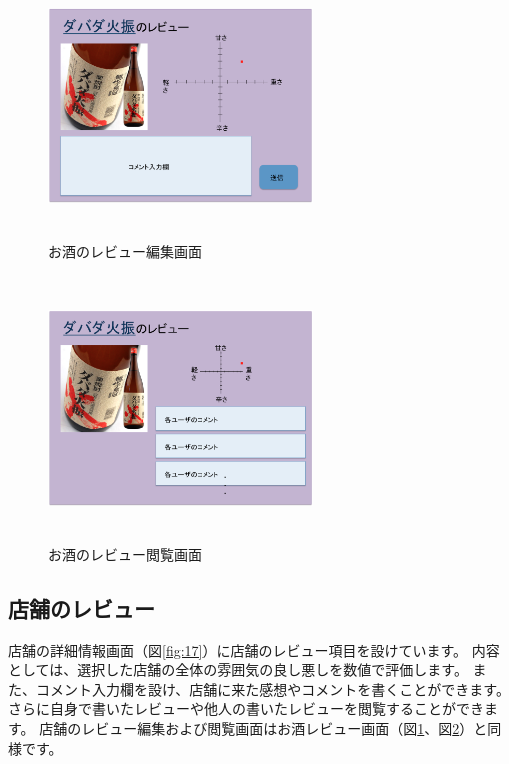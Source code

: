 \documentclass[a4j,titlepage]{jarticle}
\begin{document}
\begin {figure}[htbp]
    \begin{center}
    \includegraphics [height=7cm, width=7cm]{extrnal_design_document_image/15.eps}
    \caption {お酒のレビュー編集画面}
    \label {fig:15}
    \end{center}
\end {figure}

\begin {figure}[htbp]
    \begin{center}
    \includegraphics [height=7cm, width=7cm]{extrnal_design_document_image/16.eps}
    \caption {お酒のレビュー閲覧画面}
    \label {fig:16}
    \end{center}
\end {figure}


\subsection{店舗のレビュー}
店舗の詳細情報画面（図\ref{fig:17}）に店舗のレビュー項目を設けています。
内容としては、選択した店舗の全体の雰囲気の良し悪しを数値で評価します。
また、コメント入力欄を設け、店舗に来た感想やコメントを書くことができます。
さらに自身で書いたレビューや他人の書いたレビューを閲覧することができます。
店舗のレビュー編集および閲覧画面はお酒レビュー画面（図\ref{fig:15}、図\ref{fig:16}）と同様です。
\end{document}
